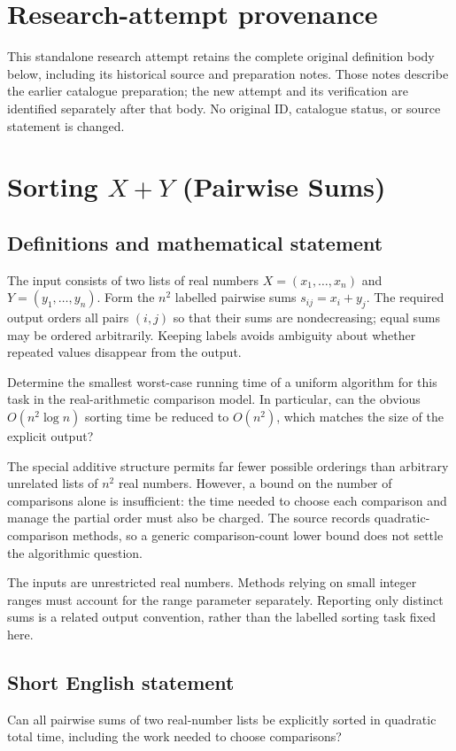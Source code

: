 \documentclass[11pt,a4paper]{article}
\begin{document}
\section*{Research-attempt provenance}
This standalone research attempt retains the complete original definition body below,
including its historical source and preparation notes. Those notes describe the
earlier catalogue preparation; the new attempt and its verification are identified
separately after that body. No original ID, catalogue status, or source statement is changed.

\section*{Sorting $X+Y$ (Pairwise Sums)}\label{statement}

\subsection{Definitions and mathematical statement}
The input consists of two lists of real numbers
$X=(x_1,\ldots,x_n)$ and $Y=(y_1,\ldots,y_n)$. Form the $n^2$ labelled
pairwise sums $s_{ij}=x_i+y_j$. The required output orders all pairs
$(i,j)$ so that their sums are nondecreasing; equal sums may be
ordered arbitrarily. Keeping labels avoids ambiguity about whether
repeated values disappear from the output.

Determine the smallest worst-case running time of a uniform algorithm
for this task in the real-arithmetic comparison model. In particular,
can the obvious $O(n^2\log n)$ sorting time be reduced to $O(n^2)$,
which matches the size of the explicit output?

The special additive structure permits far fewer possible orderings
than arbitrary unrelated lists of $n^2$ real numbers. However, a
bound on the number of comparisons alone is insufficient: the time
needed to choose each comparison and manage the partial order must
also be charged. The source records quadratic-comparison methods,
so a generic comparison-count lower bound does not settle the
algorithmic question.

The inputs are unrestricted real numbers. Methods relying on small
integer ranges must account for the range parameter separately.
Reporting only distinct sums is a related output convention, rather
than the labelled sorting task fixed here.
\subsection{Short English statement}
Can all pairwise sums of two real-number lists be explicitly sorted
in quadratic total time, including the work needed to choose comparisons?
\end{document}
